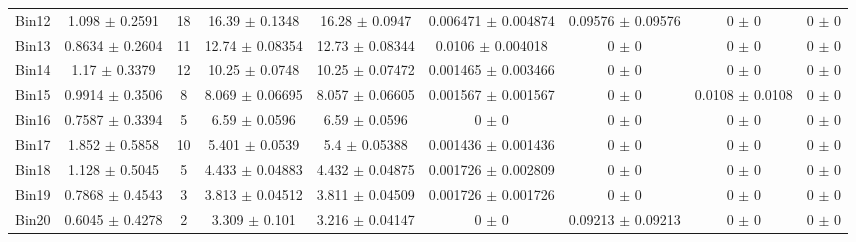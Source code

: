 \begin{tabular}{@{\extracolsep{4pt}}lcccccccc@{}}
     Bin12 & 1.098 $\pm$ 0.2591 & 18 & 16.39 $\pm$ 0.1348 & 16.28 $\pm$ 0.0947 & 0.006471 $\pm$ 0.004874 & 0.09576 $\pm$ 0.09576 & 0 $\pm$ 0 & 0 $\pm$ 0 \\ 
     Bin13 & 0.8634 $\pm$ 0.2604 & 11 & 12.74 $\pm$ 0.08354 & 12.73 $\pm$ 0.08344 & 0.0106 $\pm$ 0.004018 & 0 $\pm$ 0 & 0 $\pm$ 0 & 0 $\pm$ 0 \\ 
     Bin14 & 1.17 $\pm$ 0.3379 & 12 & 10.25 $\pm$ 0.0748 & 10.25 $\pm$ 0.07472 & 0.001465 $\pm$ 0.003466 & 0 $\pm$ 0 & 0 $\pm$ 0 & 0 $\pm$ 0 \\ 
     Bin15 & 0.9914 $\pm$ 0.3506 & 8 & 8.069 $\pm$ 0.06695 & 8.057 $\pm$ 0.06605 & 0.001567 $\pm$ 0.001567 & 0 $\pm$ 0 & 0.0108 $\pm$ 0.0108 & 0 $\pm$ 0 \\ 
     Bin16 & 0.7587 $\pm$ 0.3394 & 5 & 6.59 $\pm$ 0.0596 & 6.59 $\pm$ 0.0596 & 0 $\pm$ 0 & 0 $\pm$ 0 & 0 $\pm$ 0 & 0 $\pm$ 0 \\ 
     Bin17 & 1.852 $\pm$ 0.5858 & 10 & 5.401 $\pm$ 0.0539 & 5.4 $\pm$ 0.05388 & 0.001436 $\pm$ 0.001436 & 0 $\pm$ 0 & 0 $\pm$ 0 & 0 $\pm$ 0 \\ 
     Bin18 & 1.128 $\pm$ 0.5045 & 5 & 4.433 $\pm$ 0.04883 & 4.432 $\pm$ 0.04875 & 0.001726 $\pm$ 0.002809 & 0 $\pm$ 0 & 0 $\pm$ 0 & 0 $\pm$ 0 \\ 
     Bin19 & 0.7868 $\pm$ 0.4543 & 3 & 3.813 $\pm$ 0.04512 & 3.811 $\pm$ 0.04509 & 0.001726 $\pm$ 0.001726 & 0 $\pm$ 0 & 0 $\pm$ 0 & 0 $\pm$ 0 \\ 
     Bin20 & 0.6045 $\pm$ 0.4278 & 2 & 3.309 $\pm$ 0.101 & 3.216 $\pm$ 0.04147 & 0 $\pm$ 0 & 0.09213 $\pm$ 0.09213 & 0 $\pm$ 0 & 0 $\pm$ 0 \\ 
\hline\hline
  \end{tabular}
